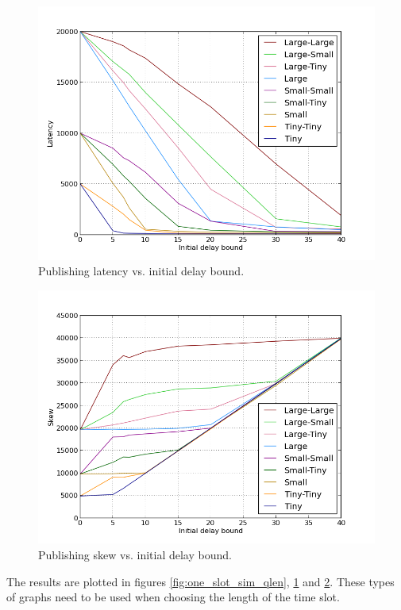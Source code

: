 \begin{figure}[ht]
\centering
\includegraphics[scale=0.5]{Images/one_slot_sim_latency.png}
\caption{Publishing latency vs. initial delay bound.}
\label{fig:one_slot_sim_latency}
\end{figure}

\begin{figure}[ht]
\centering
\includegraphics[scale=0.5]{Images/one_slot_sim_skew.png}
\caption{Publishing skew vs. initial delay bound.}
\label{fig:one_slot_sim_skew}
\end{figure}

The results are plotted in figures \ref{fig:one_slot_sim_qlen}, \ref{fig:one_slot_sim_latency} and \ref{fig:one_slot_sim_skew}. These types of graphs need to be used when choosing the length of the time slot. 


